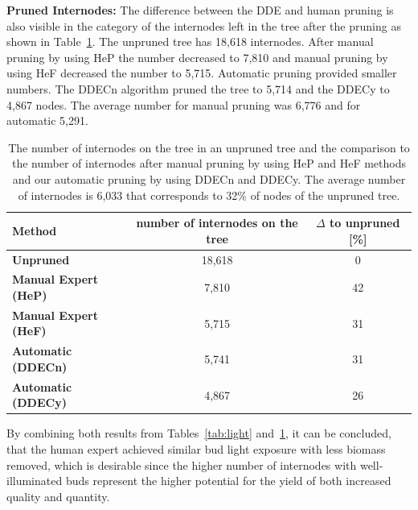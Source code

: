\noindent\textbf{Pruned Internodes:} The difference between the DDE and human pruning is also visible in the category of the internodes left in the tree after the pruning as shown in Table~\ref{tab:inodes}. The unpruned tree has 18,618 internodes. After manual pruning by using HeP the number decreased to 7,810 and manual pruning by using HeF decreased the number to 5,715. Automatic pruning provided smaller numbers. The DDECn algorithm pruned the tree to 5,714 and the DDECy to 4,867 nodes. The average number for manual pruning was 6,776 and for automatic 5,291.
\begin{table}[hbt]
\label{tab:inodes}
\begin{center}
\begin{tabular}{ |l|c|c| } 
 \hline
 \textbf{Method} & number of internodes on the tree  & $\Delta$ to unpruned [\%] \\ 
  \hline
 \textbf{Unpruned}            & 18,618 & 0 \\ 
 \hline
 \textbf{Manual Expert (HeP)} & 7,810 & 42 \\ 
 \textbf{Manual Expert (HeF)} & 5,715 & 31 \\ 
  \hline
 \textbf{Automatic (DDECn)} & 5,741 & 31 \\ 
 \textbf{Automatic (DDECy)} & 4,867 & 26 \\ 
 \hline
\end{tabular}
\caption{The number of internodes on the tree in an unpruned tree and the comparison to the number of internodes after manual pruning by using HeP and HeF methods and our automatic pruning by using DDECn and DDECy. The average number of internodes is 6,033 that corresponds to 32\% of nodes of the unpruned tree. }
\end{center}
\end{table}

By combining both results from Tables~\ref{tab:light} and~\ref{tab:inodes}, 
it can be concluded, that the human expert
achieved similar bud light exposure with less biomass removed,
which is desirable since the higher number of internodes with
well-illuminated buds represent the higher potential for the yield of
both increased quality and quantity. 

